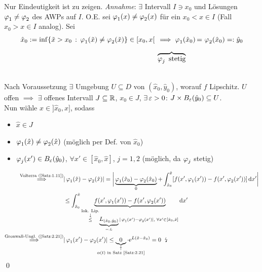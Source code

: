 \documentclass[a4paper]{article}
\begin{document}
\begin{Beweis}
Nur Eindeutigkeit ist zu zeigen.
\textit{Annahme}: $\exists$ Intervall $I\ni x_0$ und Lösungen $\operatorname{\varphi}_1\ne \operatorname{\varphi}_2$ des AWPs auf $I$. O.E. sei $\operatorname{\varphi}_1(x)\ne\operatorname{\varphi}_2(x)$ für ein $x_0<x\in I$ (Fall $x_0>x\in I$ analog). Sei 
\needspace{3cm}
\[\hat{x}_0:=\inf\{\tilde{x}>x_0\,:\,\vp_1(\tilde{x})\ne\vp_2(\tilde{x})\}\in[x_0,x{[}_{\mathord{\tikz[baseline=(B.base), inner sep = 0pt]{\node (B){};}}}\implies 
\vp_1(\hat{x}_0)\,{=}_{\mathord{\tikz[baseline=(C.base), inner sep = 0pt]{\node (C){};}}}\vp_2(\hat{x}_0)=:\hat{y}_0\]
\[\hspace{4cm}\overbrace{\vp_j\te{stetig}}^{\mathord{\tikz[baseline=(D.base), inner sep = 0pt]{\node (D){};}}}\]

\vspace{-0.2cm}\\
Nach Voraussetzung $\exists$ Umgebung $U\subseteq D$ von $(\hat{x}_0,\hat{y}_0)$, worauf $f$ Lipschitz. $U$ offen $\implies$ $\exists$ offenes Intervall $J\subseteq \mathbb R$, $x_0\in J$, $\exists \operatorname{\varepsilon}>0$: $J\times B_{\operatorname{\varepsilon}}(\hat{y}_0)\subseteq U$.\\
Nun wähle $\hat{x}\in ]\hat{x}_0,x]$, sodass
\begin{itemize}
\item $\hat{x}\in J$
\item $\operatorname{\varphi}_1(\hat{x})\ne\operatorname{\varphi}_2(\hat{x})$ (möglich per Def. von $\hat{x}_0$)
\item $\operatorname{\varphi}_j(x')\in B_{\operatorname{\varepsilon}}(\hat{y}_0)$, $\forall x'\in[\hat{x}_0,\hat{x}]$, $j=1,2$ (möglich, da $\operatorname{\varphi}_j$ stetig)
\end{itemize}
\begin{align*}
\overset{\text{Volterra (\ref{Satz:1.11})}}{\implies}& 
|\vp_1(\hat{x})-\vp_2(\hat{x})|
=\bigg{|}\underbrace{\vp_1(\hat{x}_0)-\vp_2(\hat{x}_0)}_{0}+\int_{\hat{x}_0}^{\hat{x}}[f(x',\vp_1(x'))-f(x',\vp_2(x'))]\dd x'\bigg{|}\\
&\le \int_{\hat{x}_0}^{\hat{x}}
\underbrace{f(x',\vp_1(x'))-f(x',\vp_2(x'))}_{
\overset{\substack{\text{lok. Lip.}\\\downarrow}}{\le}
\underbrace{L_{(\hat{x}_0,\hat{y}_0)}}_{=:L}
|\vp_1(x')-\vp_2(x')|,\;\forall x'\in[\hat{x}_0,\hat{x}]}\dd x'\\
\overset{\text{Gronwall-Ungl. (\ref{Satz:2.21})}}{\implies}& |\vp_1(x')-\vp_2(x')|\le \underbrace{0}_{\mathclap{\substack{\uparrow\\ \alpha(t)\te{in Satz \ref{Satz:2.21}}}}}\cdot \e^{L(\hat{x}-\hat{x}_0)}=0\;\te{\lightning}
\end{align*}
\qed
\end{Beweis}
\end{document}
